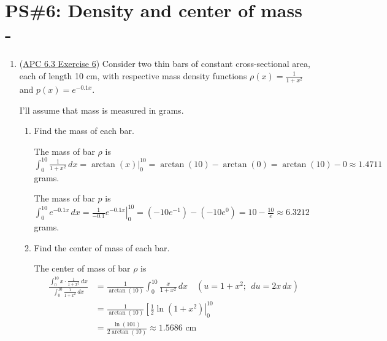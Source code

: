 


%


\allowdisplaybreaks
\section{PS\#6: Density and center of mass -  }

\everymath{\displaystyle}
\begin{enumerate}[leftmargin=0pt]

\item (\href{https://activecalculus.org/single/sec-6-3-mass.html#aQN}{APC 6.3 Exercise 6}) 
Consider two thin bars of constant cross-sectional area, each of length 10 cm, with respective mass density functions $\rho(x) = \frac1{1+x^2}$ and $p(x) = e^{-0.1x}$. \begin{red}
    I'll assume that mass is measured in grams.
\end{red}
\begin{enumerate}
    \item Find the mass of each bar.
    
    \begin{red}
    The mass of bar $\rho$ is $\int_0^{10}\frac1{1+x^2}\, dx = \arctan(x)|_0^{10} = \arctan(10) - \arctan(0) = \arctan(10) - 0 \approx 1.4711$ grams.
    
    The mass of bar $p$ is $\int_0^{10} e^{-0.1x}\, dx = \left.\frac{1}{-0.1} e^{-0.1x}\right|_0^{10} = (-10e^{-1}) - (-10e^{0}) = 10 - \frac{10}{e} \approx 6.3212$ grams.
    \end{red}
    \item Find the center of mass of each bar.
    
    \begin{red}
    The center of mass of bar $\rho$ is
    \begin{align*}
        \frac{\int_0^{10}x\cdot \frac1{1+x^2}\, dx}{\int_0^{10}\frac1{1+x^2}\, dx} &=
        \frac{1}{\arctan(10)}\int_0^{10}\frac{x}{1+x^2}\, dx \quad (u = 1 + x^2; \ \ du = 2x\, dx) \\
        &= \frac{1}{\arctan(10)} \left[\frac12 \ln(1+x^2)\right|_0^{10}\\
        &= \frac{\ln(101)}{2\arctan(10)}
        \approx 1.5686\text{ cm}
    \end{align*}
    

\end{red}
\end{enumerate}
\end{enumerate}
